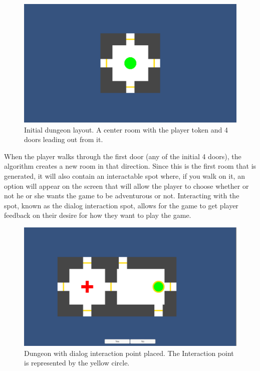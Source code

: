 \documentclass[conference,compsoc]{IEEEtran}
\begin{document}
\begin{figure}[h]
	\graphicspath{{figures/}}
	\includegraphics[width = \columnwidth ]{StartLayout.png}
	\caption{Initial dungeon layout. A center room with the player token and 4 doors leading out from it.}
	\label{fig:startroom}
\end{figure}

When the player walks through the first door (any of the initial 4 doors), the algorithm creates a new room in that direction. 
Since this is the first room that is generated, it will also contain an interactable spot where, if you walk on it, an option will appear on the screen that will allow the player to choose whether or not he or she wants the game to be adventurous or not. Interacting with the spot, known as the dialog interaction spot, allows for the game to get player feedback on their desire for how they want to play the game.

\begin{figure}[h]
	\graphicspath{{figures/}}
	\includegraphics[width = \columnwidth ]{DialogSet.png}
	\caption{Dungeon with dialog interaction point placed. The Interaction point is represented by the yellow circle.}
	\label{fig:dialogset}
\end{figure}
\end{document}
